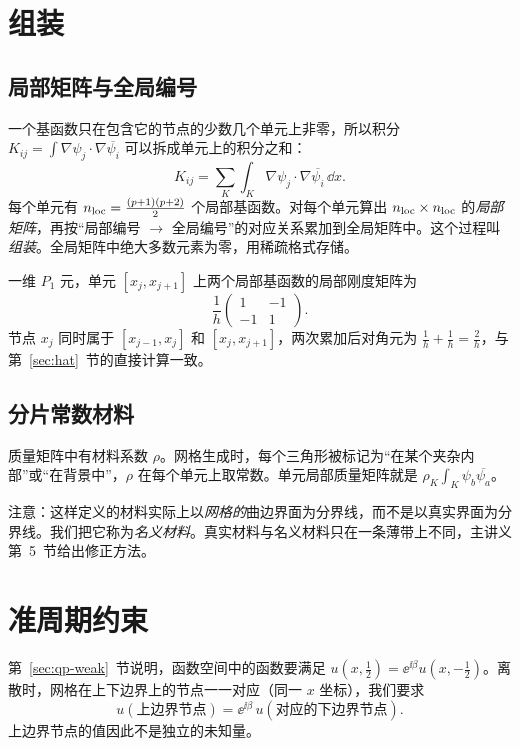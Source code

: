 \documentclass[11pt,a4paper,fontset=fandol]{ctexart}
\begin{document}
\section{组装}
\label{sec:assembly}

\subsection{局部矩阵与全局编号}

一个基函数只在包含它的节点的少数几个单元上非零，所以积分 $K_{ij}=\int\nabla\psi_j\cdot\nabla\overline{\psi_i}$ 可以拆成单元上的积分之和：
\[
K_{ij}=\sum_{K}\int_K\nabla\psi_j\cdot\nabla\overline{\psi_i}\,\dd x .
\]
每个单元有 $n_{\rm loc}=\frac{(p+1)(p+2)}2$ 个局部基函数。对每个单元算出 $n_{\rm loc}\times n_{\rm loc}$ 的\emph{局部矩阵}，再按“局部编号 $\to$ 全局编号”的对应关系累加到全局矩阵中。这个过程叫\emph{组装}。全局矩阵中绝大多数元素为零，用稀疏格式存储。

\begin{example}
一维 $P_1$ 元，单元 $[x_{j},x_{j+1}]$ 上两个局部基函数的局部刚度矩阵为
\[
\frac1h\begin{pmatrix}1&-1\\-1&1\end{pmatrix}.
\]
节点 $x_j$ 同时属于 $[x_{j-1},x_j]$ 和 $[x_j,x_{j+1}]$，两次累加后对角元为 $\frac1h+\frac1h=\frac2h$，与第~\ref{sec:hat}~节的直接计算一致。
\end{example}

\subsection{分片常数材料}

质量矩阵中有材料系数 $\rho$。网格生成时，每个三角形被标记为“在某个夹杂内部”或“在背景中”，$\rho$ 在每个单元上取常数。单元局部质量矩阵就是 $\rho_K\int_K\psi_b\overline{\psi_a}$。

注意：这样定义的材料实际上以\emph{网格的}曲边界面为分界线，而不是以真实界面为分界线。我们把它称为\emph{名义材料}。真实材料与名义材料只在一条薄带上不同，主讲义第~5~节给出修正方法。

\section{准周期约束}
\label{sec:qp-constraint}

第~\ref{sec:qp-weak}~节说明，函数空间中的函数要满足 $u(x,\tfrac12)=\ee^{\ii\beta}u(x,-\tfrac12)$。离散时，网格在上下边界上的节点一一对应（同一 $x$ 坐标），我们要求
\[
u(\text{上边界节点})=\ee^{\ii\beta}\,u(\text{对应的下边界节点}).
\]
上边界节点的值因此不是独立的未知量。
\end{document}
